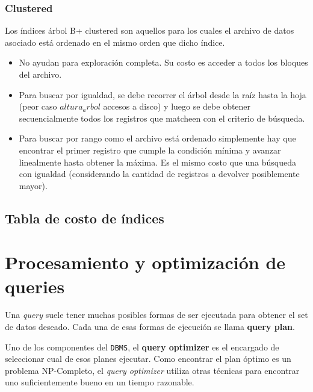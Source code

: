 \documentclass[]{article}
\begin{document}
\subsubsection{Clustered}
Los índices árbol B+ clustered son aquellos para los cuales el archivo de datos asociado está ordenado en el mismo orden que dicho índice.

\begin{itemize}
    \item No ayudan para exploración completa. Su costo es acceder a todos los bloques del archivo.
    \item Para buscar por igualdad, se debe recorrer el árbol desde la raíz hasta la hoja (peor caso $altura_arbol$ accesos a disco) y luego se debe obtener secuencialmente todos los registros que matcheen con el criterio de búsqueda.
    \item Para buscar por rango como el archivo está ordenado simplemente hay que encontrar el primer registro que cumple la condición mínima y avanzar linealmente hasta obtener la máxima. Es el mismo costo que una búsqueda con igualdad (considerando la cantidad de registros a devolver posiblemente mayor).
\end{itemize}

\subsection{Tabla de costo de índices}


\section{Procesamiento y optimización de queries}
Una \emph{query} suele tener muchas posibles formas de ser ejecutada para obtener el set de datos deseado. Cada una de esas formas de ejecución se llama \textbf{query plan}.

Uno de los componentes del \texttt{DBMS}, el \textbf{query optimizer} es el encargado de seleccionar cual de esos planes ejecutar. Como encontrar el plan óptimo es un problema NP-Completo, el \emph{query optimizer} utiliza otras técnicas para encontrar uno suficientemente bueno en un tiempo razonable.
\end{document}
